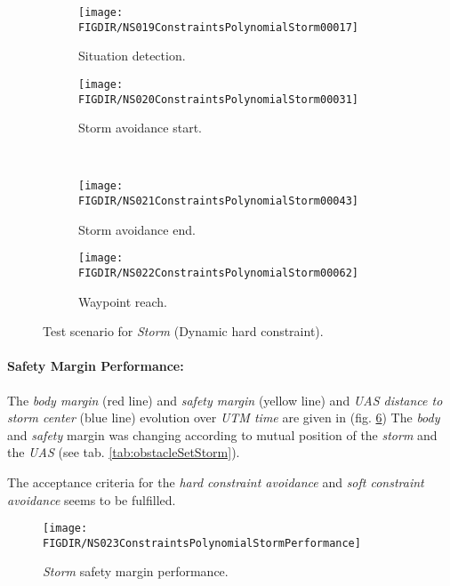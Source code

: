     \begin{figure}[H]
        \centering
        \begin{subfigure}{0.48\textwidth}
        	\centering
            \texttt{[image: \\FIGDIR/NS019ConstraintsPolynomialStorm00017]}
            \caption{Situation detection.}
            \label{fig:stromSituationDetection}
        \end{subfigure}
        \begin{subfigure}{0.48\textwidth}
        	\centering
            \texttt{[image: \\FIGDIR/NS020ConstraintsPolynomialStorm00031]} 
            \caption{Storm avoidance start.}
            \label{fig:stormAvoidanceStart}
        \end{subfigure}
        \\
        \begin{subfigure}{0.48\textwidth}
        	\centering
            \texttt{[image: \\FIGDIR/NS021ConstraintsPolynomialStorm00043]} 
            \caption{Storm avoidance end.}
            \label{fig:stormAvoidanceEnd}
        \end{subfigure}
        \begin{subfigure}{0.48\textwidth}
        	\centering
            \texttt{[image: \\FIGDIR/NS022ConstraintsPolynomialStorm00062]} 
            \caption{Waypoint reach.}
            \label{fig:stormWaypointReach}
        \end{subfigure}
        \caption{Test scenario for \emph{Storm} (Dynamic hard constraint). }
        \label{fig:testCaseStormAvoidance}
    \end{figure}
    
    \paragraph{Safety Margin Performance:} The \emph{body margin} (red line) and \emph{safety margin} (yellow line) and \emph{UAS distance to storm center} (blue line) evolution over \emph{UTM time} are given in (fig. \ref{fig:testCaseStormAvoidancePerformance}) The \emph{body} and \emph{safety} margin was changing according to mutual position of the \emph{storm} and the \emph{UAS} (see tab. \ref{tab:obstacleSetStorm}). 
    
    The acceptance criteria for the \emph{hard constraint avoidance} and \emph{soft constraint avoidance} seems to be fulfilled. 
    
    \begin{figure}[H]
        \centering
        \texttt{[image: \\FIGDIR/NS023ConstraintsPolynomialStormPerformance]} 
        \caption{\emph{Storm} safety margin performance.}
        \label{fig:testCaseStormAvoidancePerformance}
    \end{figure}
    
